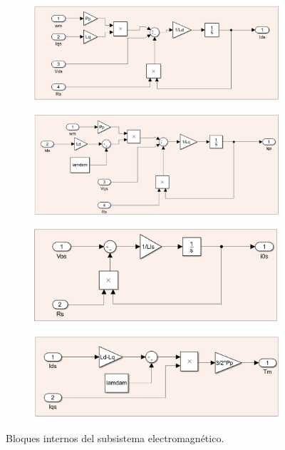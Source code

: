 \documentclass{article}
\begin{document}
\begin{figure}[H]
    \centering
    \begin{subfigure}[]{0.75\textwidth}
        \centering
        \includegraphics[width=1\textwidth]{sub_electromagentico4.png}
    \end{subfigure}
    \begin{subfigure}[b]{0.75\textwidth}
        \centering
        \includegraphics[width=1\textwidth]{sub_electromagentico3.png}
    \end{subfigure}
    \begin{subfigure}[b]{0.75\textwidth}
        \centering
        \includegraphics[width=1\textwidth]{sub_electromagentico2.png}
    \end{subfigure}
    \begin{subfigure}[b]{0.75\textwidth}
        \centering
        \includegraphics[width=1\textwidth]{sub_electromagentico5.png}
    \end{subfigure}
    \caption{Bloques internos del subsistema electromagnético.}
\end{figure}
\end{document}
